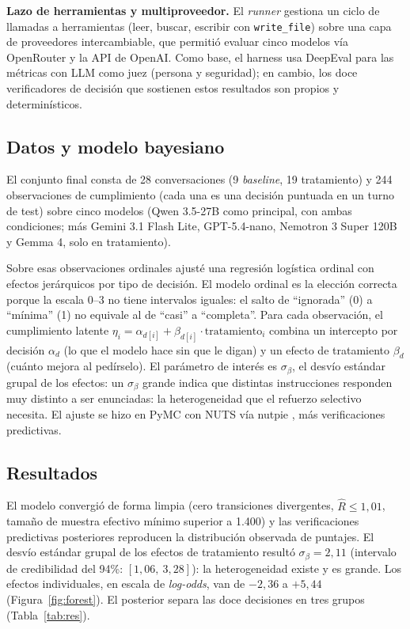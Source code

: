 \documentclass[12pt]{article}
\begin{document}
\textbf{Lazo de herramientas y multiproveedor.} El \emph{runner} gestiona un ciclo
de llamadas a herramientas (leer, buscar, escribir con \texttt{write\_file}) sobre
una capa de proveedores intercambiable, que permitió evaluar cinco modelos vía
OpenRouter y la API de OpenAI. Como base, el harness usa DeepEval \citep{deepeval}
para las métricas con LLM como juez (persona y seguridad); en cambio, los doce
verificadores de decisión que sostienen estos resultados son propios y
determinísticos.

\subsection{Datos y modelo bayesiano}

El conjunto final consta de 28 conversaciones (9 \emph{baseline}, 19 tratamiento)
y 244 observaciones de cumplimiento (cada una es una decisión puntuada en un turno
de test) sobre cinco modelos (Qwen 3.5-27B como principal, con ambas condiciones;
más Gemini 3.1 Flash Lite, GPT-5.4-nano, Nemotron 3 Super 120B y Gemma 4, solo en
tratamiento).

Sobre esas observaciones ordinales ajusté una regresión logística ordinal con
efectos jerárquicos por tipo de decisión. El modelo ordinal es la elección
correcta porque la escala 0--3 no tiene intervalos iguales: el salto de
``ignorada'' (0) a ``mínima'' (1) no equivale al de ``casi'' a ``completa''. Para
cada observación, el cumplimiento latente
$\eta_i = \alpha_{d[i]} + \beta_{d[i]}\cdot\text{tratamiento}_i$ combina un
intercepto por decisión $\alpha_d$ (lo que el modelo hace sin que le digan) y un
efecto de tratamiento $\beta_d$ (cuánto mejora al pedírselo). El parámetro de
interés es $\sigma_\beta$, el desvío estándar grupal de los efectos: un
$\sigma_\beta$ grande indica que distintas instrucciones responden muy distinto a
ser enunciadas: la heterogeneidad que el refuerzo selectivo necesita. El ajuste se
hizo en PyMC \citep{pymc2023} con NUTS \citep{hoffman2014} vía nutpie
\citep{nutpie2024}, más verificaciones predictivas.

\subsection{Resultados}

El modelo convergió de forma limpia (cero transiciones divergentes,
$\hat{R}\leq 1{,}01$, tamaño de muestra efectivo mínimo superior a 1.400) y las
verificaciones predictivas posteriores reproducen la distribución observada de
puntajes. El desvío estándar grupal de los efectos de tratamiento resultó
$\sigma_\beta = 2{,}11$ (intervalo de credibilidad del 94\%: $[1{,}06,\ 3{,}28]$):
la heterogeneidad existe y es grande. Los efectos individuales, en escala de
\emph{log-odds}, van de $-2{,}36$ a $+5{,}44$ (Figura~\ref{fig:forest}). El
posterior separa las doce decisiones en tres grupos (Tabla~\ref{tab:res}).
\end{document}
